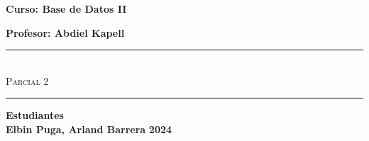 \begin{titlepage}
\begin{center}
      {\Large \textbf{Curso: Base de Datos II}}\medskip
      
      {\Large \textbf{Profesor: Abdiel Kapell}}

      \rule{\linewidth}{0.75mm}\\
          {\Large \textsc{Parcial 2}} 
      \rule{\linewidth}{0.75mm}\medskip

      {\Large \textbf{Estudiantes}}\\
      \vspace{5mm}
      {\Large \textbf{Elbin Puga, Arland Barrera}}
      \vfill
      {\Huge \textbf{2024}}

  \end{center}
\end{titlepage}